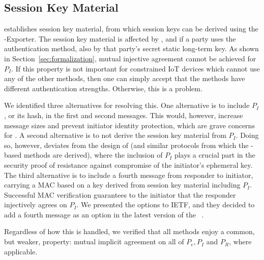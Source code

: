 \documentclass[a4paper,twoside,draft]{article}
\begin{document}
\subsection{Session Key Material}
\label{sec:sessionKeyMaterial}
\mEdhoc{} establishes session key material, from which session keys
can be derived using the \mEdhoc{}-Exporter.
%
The session key material is affected by \mGxy{}, and if a party uses the
\mStat{} authentication method, also by that party's secret static long-term key.
%
As shown in Section~\ref{sec:formalization}, mutual injective agreement cannot
be achieved for $P_I$.
%
If this property is not important for constrained IoT devices which cannot use
any of the other methods, then one can simply accept that the methods have
different authentication strengths.
%
Otherwise, this is a problem.
%

We identified three alternatives for resolving this.
%
One alternative is to include $P_I$, or its hash, in the first and
second messages.
%
This would, however, increase message sizes and prevent initiator identity
protection, which are grave concerns for \mEdhoc{}.
%
A second alternative is to not derive the session key material from $P_I$.
%
Doing so, however, deviates from the design of \mOptls{} (and similar protocols
from which the \mStat{}-based methods are derived), where the inclusion of
$P_I$ plays a crucial part in the security proof of resistance against
compromise of the initiator's ephemeral key.
%
The third alternative is to include a fourth message from responder to initiator,
carrying a MAC based on a key derived from session key material including $P_I$.
%
Successful MAC verification guarantees
to the initiator that the responder injectively agrees on $P_I$.
%
We presented the options to IETF, and they decided to add a
fourth message as an option in the latest version of the
\mSpec{}~\cite{latest-ietf-lake-edhoc-05}.
%

Regardless of how this is handled, we verified that all methods
enjoy a common, but weaker, property: mutual implicit agreement
on all of $P_e, P_I$ and $P_R$, where applicable.
%
\end{document}
